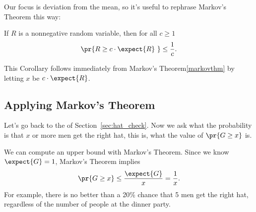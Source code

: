\iffalse
We will show that $\expect{R} \geq x \pr{R \geq x}$.  Dividing
both sides by $x$ gives the desired result.

So let $I_x$ be the indicator variable for the event $[R \geq x]$, and
consider the random variable $x I_x$.  Note that
\[
R \geq x I_x,
\]
because at any sample point $\omega$,
\begin{itemize}
\item if $R(\omega) \geq x$ then $R(\omega) \geq x = x\cdot 1 = x I_x(\omega)$, and
\item if $R(\omega) < x$ then $R(\omega) \geq 0 = x \cdot 0 = xI_x(\omega)$.
\end{itemize}
Therefore,
\begin{align*}
\expect{R} & \geq \expect{x I_x} & (\text{since } R \geq xI_x)\\
   & = x \expect{I_x} & \text{(linearity of $\expect{\cdot}$)}\\
   & = x \pr{I_x=1}  &  \text{($I_x$ is an indicator)}\\
   & = x \pr{R \geq x}.  &  (\text{def\ of $I_x$})
\end{align*}

\fi

Our focus is deviation from the mean, so it's useful to rephrase
Markov's Theorem this way:
\begin{corollary}
If $R$ is a nonnegative random variable, then for all $c \geq 1$
\begin{equation}
\pr{R \geq c \cdot \expect{R}\ }  \leq  \frac{1}{c}.\label{markovaboveemean}
\end{equation}
\end{corollary}
This Corollary follows immediately from Markov's Theorem\eqref{markovthm}
by letting $x$ be $c \cdot \expect{R}$.

\iffalse
This gives:
\[
\pr{R \geq c \cdot \expect{R}\ } \leq \frac{\expect{R}}{c \cdot \expect{R}} =
\frac{1}{c}.
\]
\end{proof}
\fi

\subsection{Applying Markov's Theorem}

Let's go back to the  of
Section~\ref{sec:hat_check}.  Now we ask what the probability is that
$x$ or more men get the right hat, this is, what the value of $\pr{G
  \geq x}$ is.

We can compute an upper bound with Markov's Theorem.  Since we know
$\expect{G}=1$, Markov's Theorem implies
\[
\pr{G \geq x} \leq \frac{\expect{G}}{x} = \frac{1}{x}.
\]
For example, there is no better than a 20\% chance that 5 men get the
right hat, regardless of the number of people at the dinner party.

